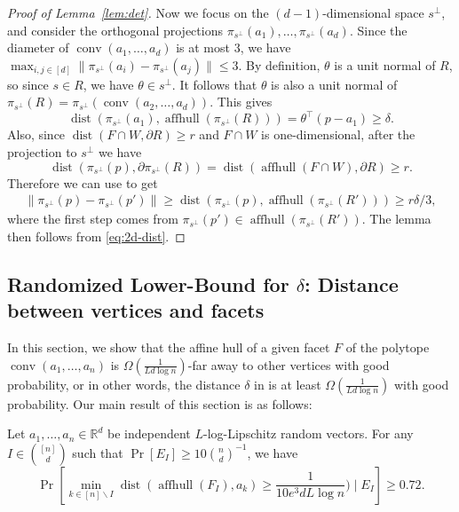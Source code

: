 \documentclass{article}\usepackage[a4paper,margin=20mm]{geometry}
\newcommand{\R}{\mathbb R}
\newcommand{\aff}{\operatorname{affhull}}
\newcommand{\conv}{\operatorname{conv}}
\newcommand{\dist}{\operatorname{dist}}
\begin{document}
\begin{proof}[Proof of Lemma~\ref{lem:det}]
Now we focus on the $(d-1)$-dimensional space $s^\perp$, and consider the orthogonal projections $\pi_{s^\perp}(a_1), \ldots, \pi_{s^\perp}(a_d)$.
Since the diameter of $\conv(a_1, \ldots, a_d)$ is at most $3$, we have $\max_{i, j \in [d]} \|\pi_{s^\perp}(a_i) - \pi_{s^\perp}(a_j)\| \leq 3$.
By definition, $\theta$ is a unit normal of $R$, so since $s \in R$, we have $\theta \in s^{\perp}$. It follows that $\theta$ is also a unit normal of $\pi_{s^\perp}(R) = \pi_{s^\perp}(\conv(a_2, \ldots, a_d))$. This gives
$$\dist(\pi_{s^\perp}(a_1), \aff(\pi_{s^\perp}(R))) = \theta^\top (p - a_1) \geq \delta.$$
Also, since $\dist(F \cap W, \partial R) \geq r$ and $F \cap W$ is one-dimensional, after the projection to $s^\perp$ we have
$$\dist(\pi_{s^\perp}(p), \partial \pi_{s^\perp}(R)) = \dist(\aff(F \cap W), \partial R) \geq r.$$
Therefore we can use  to get
\begin{align*}
    \|\pi_{s^\perp}(p) - \pi_{s^\perp}(p')\| \geq \dist(\pi_{s^\perp}(p), \aff(\pi_{s^\perp}(R'))) \geq r \delta /3,
\end{align*}
where the first step comes from $\pi_{s^\perp}(p') \in \aff(\pi_{s^\perp}(R'))$.
The lemma then follows from \eqref{eq:2d-dist}.
\end{proof}






\subsection{Randomized Lower-Bound for \texorpdfstring{$\delta$}{delta}: Distance between vertices and facets}\label{sub:rand-delta-lb}

In this section, we show that the affine hull of a given facet $F$ of the polytope
$\conv(a_1, \ldots, a_n)$ is $\Omega(\frac{1}{Ld\log n})$-far away to other
vertices with good probability, or in other words, the distance $\delta$ in
 is at least $\Omega(\frac{1}{Ld\log n})$ with good probability.
Our main result of this section is as follows:

\begin{lemma}\label{lem:rand-delta-lb}
    Let $a_1,\dots,a_n \in \R^d$ be independent $L$-log-Lipschitz random vectors.
    For any $I \in \binom{[n]}{d}$ such that $\Pr[E_I] \geq 10\binom{n}{d}^{-1}$, we have
    \[
        \Pr[\min_{k \in [n] \backslash I}\dist(\aff(F_I), a_k) \geq \frac{1}{10e^3 dL \log n}) \mid E_I] \geq 0.72.
    \]
\end{lemma}
\end{document}
